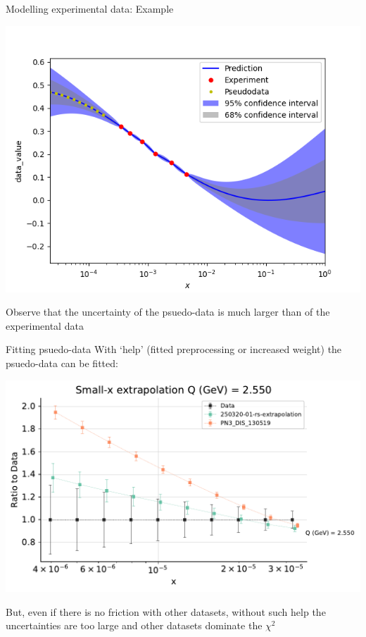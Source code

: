 \documentclass[aspectratio=169,11pt]{beamer}
\begin{document}
\begin{frame}[t]{Modelling experimental data: Example}
  \begin{center}
    \includegraphics[height=0.6\textheight]{figures/gp_hera.png}
  \end{center}
  Observe that the uncertainty of the psuedo-data is much larger than of the experimental data
\end{frame}


\begin{frame}[t]{Fitting psuedo-data}
  With `help' (fitted preprocessing or increased weight) the psuedo-data can be fitted:
  \begin{center}
    \includegraphics[height=0.5\textheight]{figures/extradata_fitted.pdf}
  \end{center}
  But, even if there is no friction with other datasets, without such help the uncertainties are too large and other datasets dominate the $\chi^2$
\end{frame}
\end{document}
